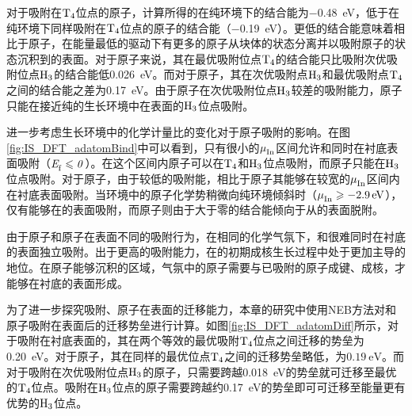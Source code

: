 对于吸附在$\rm T_{4} \it$位点的原子，计算所得的在纯环境下的结合能为\SI{-0.48}{\electronvolt}，低于在纯环境下同样吸附在$\rm T_{4} \it$位点的原子的结合能（\SI{-0.19}{\electronvolt}）。更低的结合能意味着相比于原子，在能量最低的驱动下有更多的原子从块体的状态分离并以吸附原子的状态沉积到的表面。对于原子来说，其在最优吸附位点$\rm T_{4} \it$的结合能只比吸附次优吸附位点$\rm H_{3} \it$的结合能低\SI{0.026}{\electronvolt}。而对于原子，其在次优吸附点$\rm H_{3} \it$和最优吸附点$\rm T_{4} \it$之间的结合能之差为\SI{0.17}{\electronvolt}。由于原子在次优吸附位点$\rm H_{3} \it$较差的吸附能力，原子只能在接近纯的生长环境中在表面的$\rm H_{3} \it$位点吸附。

进一步考虑生长环境中的化学计量比的变化对于原子吸附的影响。在图\ref{fig:IS_DFT_adatomBind}中可以看到，只有很小的$\it \mu_{\rm In}^{\rm } \it$区间允许和同时在衬底表面吸附（$\it E_{\rm f}^{\rm } \it \leqslant 0$）。在这个区间内原子可以在$\rm T_{4} \it$和$\rm H_{3} \it$位点吸附，而原子只能在$\rm H_{3} \it$位点吸附。对于原子，由于较低的吸附能，相比于原子其能够在较宽的$\it \mu_{\rm In}^{\rm } \it$区间内在衬底表面吸附。当环境中的原子化学势稍微向纯环境倾斜时（$\it \mu_{\rm In}^{\rm } \it\geqslant \SI{-2.9}{\electronvolt}$），仅有能够在的表面吸附，而原子则由于大于零的结合能倾向于从的表面脱附。

由于原子和原子在表面不同的吸附行为，在相同的化学气氛下，和很难同时在衬底的表面独立吸附。出于更高的吸附能力，在的初期成核生长过程中处于更加主导的地位。在原子能够沉积的区域，气氛中的原子需要与已吸附的原子成键、成核，才能够在衬底的表面形成。


为了进一步探究吸附、原子在表面的迁移能力，本章的研究中使用NEB方法对和原子吸附在表面后的迁移势垒进行计算。如图\ref{fig:IS_DFT_adatomDiff}所示，对于吸附在衬底表面的，其在两个等效的最优吸附$\rm T_{4} \it$位点之间迁移的势垒为\SI{0.20}{\electronvolt}。对于原子，其在同样的最优位点$\rm T_{4} \it$之间的迁移势垒略低，为$\SI{0.19}{\electronvolt}$。而对于吸附在次优吸附位点$\rm H_{3} \it$的原子，只需要跨越\SI{0.018}{\electronvolt}的势垒就可迁移至最优的$\rm T_{4} \it$位点。吸附在$\rm H_{3} \it$位点的原子需要跨越约\SI{0.17}{\electronvolt}的势垒即可可迁移至能量更有优势的$\rm H_{3} \it$位点。

